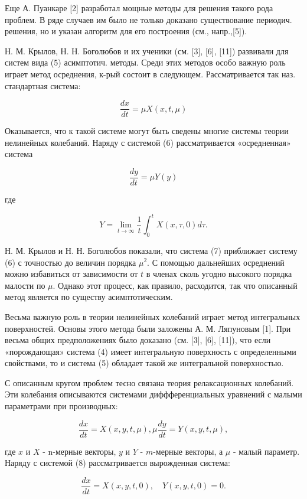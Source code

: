 \documentclass[10pt]{article}
\begin{document}
Еще А. Пуанкаре [2] разработал мощные методы для решения такого рода проблем. В ряде случаев им было не только доказано существование периодич. решения, но и указан алгоритм для его построения (см., напр.,[5]).



Н. М. Крылов, Н. Н. Боголюбов и их ученики (см. [3], [6], [11]) развивали для систем вида (5) асимптотич. методы. Среди этих методов особо важную роль играет метод осреднения, к-рый состоит в следующем. Рассматривается так наз. стандартная система:



\[

\frac{d x}{d t}=\mu X(x, t, \mu)

\]



Оказывается, что к такой системе могут быть сведены многие системы теории нелинейных колебаний. Наряду с системой (6) рассматривается «осредненная» система



\[

\frac{d y}{d t}=\mu Y(y)

\]



где



\[

Y=\lim _{t \rightarrow \infty} \frac{1}{t} \int_{0}^{t} X(x, \tau, 0) d \tau .

\]



Н. М. Крылов и Н. Н. Боголюбов показали, что система (7) приближает систему (6) с точностью до величин порядка $\mu^{2}$. С помощью дальнейших осреднений можно избавиться от зависимости от $t$ в членах сколь угодно высокого порядка малости по $\mu$. Однако этот процесс, как правило, расходится, так что описанный метод является по существу асимптотическим.



Весьма важную роль в теории нелинейных колебаний играет метод интегральных поверхностей. Основы этого метода были заложены А. М. Ляпуновым [1]. При весьма общих предположениях было доказано (см. [3], [6], [11]), что если «порождающая» система (4) имеет интегральную поверхность с определенными свойствами, то и система (5) обладает такой же интегральной поверхностью.



С описанным кругом проблем тесно связана теория релаксационных колебаний. Эти колебания описываются системами диффференциальных уравнений с малыми параметрами при производных:



\[

\frac{d x}{d t}=X(x, y, t, \mu), \mu \frac{d y}{d t}=Y(x, y, t, \mu),

\]



где $x$ и $X$ - n-мерные векторы, $y$ и $Y$ - $m$-мерные векторы, а $\mu$ - малый параметр. Наряду с системой (8) рассматривается вырожденная система:



\[

\frac{d x}{d t}=X(x, y, t, 0), \quad Y(x, y, t, 0)=0 .

\]
\end{document}
